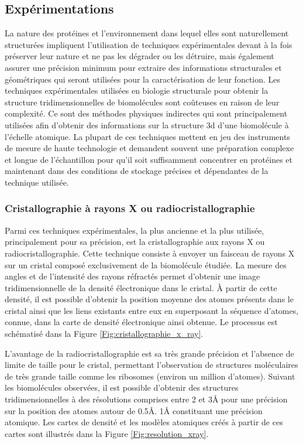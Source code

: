 \subsection{Expérimentations}

La nature des protéines et l'environnement dans lequel elles sont naturellement structurées impliquent l'utilisation de techniques expérimentales devant à la fois préserver leur nature et ne pas les dégrader ou les détruire, mais également assurer une précision minimum pour extraire des informations structurales et géométriques qui seront utilisées pour la caractérisation de leur fonction.
Les techniques expérimentales utilisées en biologie structurale pour obtenir la structure tridimensionnelles de biomolécules sont coûteuses en raison de leur complexité. Ce sont des méthodes physiques indirectes qui sont principalement utilisées afin d'obtenir des informations sur la structure 3d d'une biomolécule à l'échelle atomique. La plupart de ces techniques mettent en jeu des instruments de mesure de haute technologie et demandent souvent une préparation complexe et longue de l'échantillon pour qu'il soit suffisamment concentrer en protéines et maintenant dans des conditions de stockage précises et dépendantes de la technique utilisée.

\subsubsection{Cristallographie à rayons X ou radiocristallographie}

Parmi ces techniques expérimentales, la plus ancienne et la plus utilisée, principalement pour sa précision, est la cristallographie aux rayons X ou radiocristallographie. Cette technique consiste à envoyer un faisceau de rayons X sur un cristal composé exclusivement de la biomolécule étudiée. La mesure des angles et de l'intensité des rayons réfractés permet d'obtenir une image tridimensionnelle de la densité électronique dans le cristal. À partir de cette densité, il est possible d'obtenir la position moyenne des atomes présents dans le cristal ainsi que les liens existants entre eux en superposant la séquence d'atomes, connue, dans la carte de densité électronique ainsi obtenue. Le processus est schématisé dans la Figure \ref{Fig:cristallographie_x_ray}.

L'avantage de la radiocristallographie est sa très grande précision et l'absence de limite de taille pour le cristal, permettant l'observation de structures moléculaires de très grande taille comme les ribosomes (environ un million d'atomes). Suivant les biomolécules observées, il est possible d'obtenir des structures tridimensionnelles à des résolutions comprises entre 2 et 3\r{A} pour une précision sur la position des atomes autour de 0.5\r{A}. 1\r{A} constituant une précision atomique. Les cartes de densité et les modèles atomiques créés à partir de ces cartes sont illustrés dans la Figure \ref{Fig:resolution_xray}.

